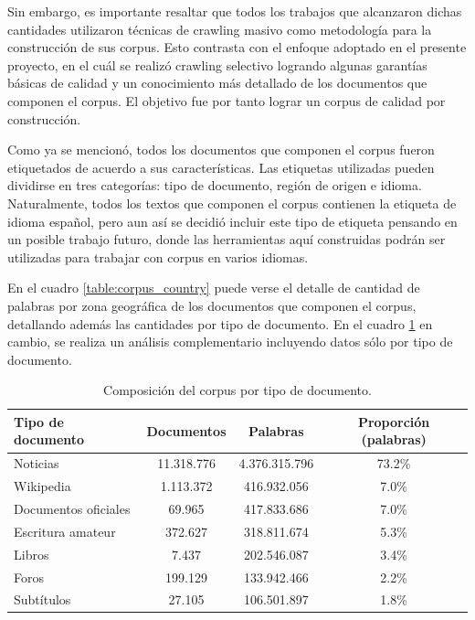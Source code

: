 Sin embargo, es importante resaltar que todos los trabajos que alcanzaron dichas cantidades
utilizaron técnicas de crawling masivo como metodología para la construcción de sus corpus. Esto
contrasta con el enfoque adoptado en el presente proyecto, en el cuál se realizó crawling
selectivo logrando algunas garantías básicas de calidad y un conocimiento más detallado
de los documentos que componen el corpus. El objetivo fue por tanto lograr un corpus de
calidad por construcción.

Como ya se mencionó, todos los documentos que componen el corpus fueron etiquetados de
acuerdo a sus características. Las etiquetas utilizadas pueden dividirse en tres categorías:
tipo de documento, región de origen e idioma. Naturalmente, todos los textos que componen
el corpus contienen la etiqueta de idioma español, pero aun así se decidió incluir este tipo de
etiqueta pensando en un posible trabajo futuro, donde las herramientas aquí construidas podrán
ser utilizadas para trabajar con corpus en varios idiomas.

En el cuadro \ref{table:corpus_country} puede verse el detalle de cantidad de palabras por
zona geográfica de los documentos que componen el corpus, detallando además las
cantidades por tipo de documento. En el cuadro \ref{table:corpus_doc_type} en cambio, se
realiza un análisis complementario incluyendo datos sólo por tipo de documento.

\begin{table}[h]
    \centering
    \begin{tabular}{lccc}
        \hline
        Tipo de documento & Documentos & Palabras & Proporción (palabras)\\
        \hline
        Noticias & 11.318.776 & 4.376.315.796 & 73.2\%\\
        Wikipedia & 1.113.372 & 416.932.056 & 7.0\%\\
        Documentos oficiales & 69.965 & 417.833.686 & 7.0\%\\
        Escritura amateur & 372.627 & 318.811.674 & 5.3\%\\
        Libros & 7.437 & 202.546.087 & 3.4\%\\
        Foros & 199.129 & 133.942.466 & 2.2\%\\
        Subtítulos & 27.105 & 106.501.897 & 1.8\%\\
        \hline
    \end{tabular}
    \caption{Composición del corpus por tipo de documento.}
    \label{table:corpus_doc_type}
\end{table}

